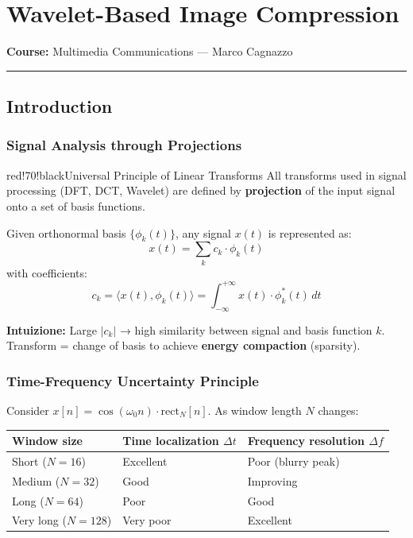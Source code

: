 \chapter{Wavelet-Based Image Compression}

\textbf{Course:} Multimedia Communications — Marco Cagnazzo

\bigskip\hrule\bigskip

\section{Introduction}

\subsection{Signal Analysis through Projections}

\begin{calloutbox}{red!70!black}{Universal Principle of Linear Transforms}
All transforms used in signal processing (DFT, DCT, Wavelet) are defined by \textbf{projection} of the input signal onto a set of basis functions.

Given orthonormal basis $\{\phi_k(t)\}$, any signal $x(t)$ is represented as:
\[
x(t) = \sum_k c_k \cdot \phi_k(t)
\]
with coefficients:
\[
c_k = \langle x(t), \phi_k(t) \rangle = \int_{-\infty}^{+\infty} x(t) \cdot \phi_k^*(t)\, dt
\]

\textbf{Intuizione:} Large $|c_k|$ → high similarity between signal and basis function $k$. Transform = change of basis to achieve \textbf{energy compaction} (sparsity).
\end{calloutbox}

\subsection{Time-Frequency Uncertainty Principle}

Consider $x[n] = \cos(\omega_0 n) \cdot \text{rect}_N[n]$. As window length $N$ changes:

\begin{center}
\begin{tabular}{|l|l|l|}
\hline
\textbf{Window size} & \textbf{Time localization $\Delta t$} & \textbf{Frequency resolution $\Delta f$} \\ \hline
Short ($N=16$) & Excellent & Poor (blurry peak) \\ \hline
Medium ($N=32$) & Good & Improving \\ \hline
Long ($N=64$) & Poor & Good \\ \hline
Very long ($N=128$) & Very poor & Excellent \\ \hline
\end{tabular}
\end{center}

